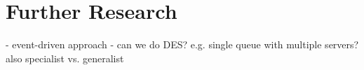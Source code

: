 \section{Further Research}
- event-driven approach
- can we do DES? e.g. single queue with multiple servers? also specialist vs. generalist